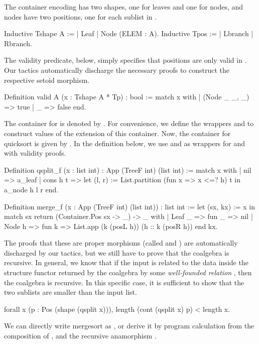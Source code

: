 \documentclass[a4paper,UKenglish,cleveref, autoref, thm-restate]{lipics-v2021}
\begin{document}
The container encoding  has two shapes, one for leaves and one for
nodes, and nodes have two positions, one for each sublist  in
.
\begin{coqcode}
Inductive Tshape A := | Leaf | Node (ELEM : A).
Inductive Tpos := | Lbranch | Rbranch. 
\end{coqcode}
The validity predicate,  below, simply specifies that positions are
only valid in . Our tactics automatically discharge the necessary
proofs to construct the respective setoid morphism.
\begin{coqcode}
Definition valid {A} (x : Tshape A * Tp) : bool :=
  match x with | (Node _ _, _)  => true | _ => false end.
\end{coqcode}
The container for  is denoted by . For convenience, we
define the wrappers  and  to construct values of the
extension of this container.
Now, the container for quicksort is given by .
In the definition below, we use  and  as wrappers for
 and  with validity proofs.
\begin{coqcode}
Definition qsplit_f (x : list int) : App (TreeF int) (list int) :=
  match x with
  | nil => a_leaf
  | cons h t => let (l, r) := List.partition (fun x => x <=? h) t in a_node h l r
  end.

Definition merge_f (x : App (TreeF int) (list int)) : list int :=
  let (sx, kx) := x in
  match sx return (Container.Pos sx -> _) -> _ with
  | Leaf _ => fun _ => nil
  | Node h => fun k => List.app (k (posL h)) (h :: k (posR h))
  end kx.
\end{coqcode}
The proofs that these are proper morphisms (called  and )
are automatically discharged by our tactics, but we still have to prove that the
coalgebra  is recursive. In general, we know that if the input is
related to the data inside the structure functor returned by the coalgebra by
some \emph{well-founded relation} , then the coalgebra is recursive. In
this specific case, it is sufficient to show that the two sublists are smaller
than the input list.
\begin{coqcode}
  forall x (p : Pos (shape (qsplit x))), length (cont (qsplit x) p) < length x.
\end{coqcode}
We can directly write mergesort as , or derive it by
program calculation from the composition of , and the
recursive anamorphism .
\end{document}
